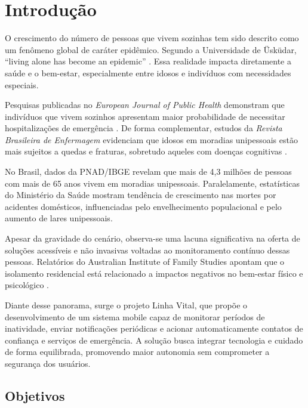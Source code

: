 \chapter{Introdução}

O crescimento do número de pessoas que vivem sozinhas tem sido descrito como um fenômeno global de caráter epidêmico. Segundo a Universidade de Üsküdar, ``living alone has become an epidemic'' \cite{erdogan2024}. Essa realidade impacta diretamente a saúde e o bem-estar, especialmente entre idosos e indivíduos com necessidades especiais.

Pesquisas publicadas no \textit{European Journal of Public Health} demonstram que indivíduos que vivem sozinhos apresentam maior probabilidade de necessitar hospitalizações de emergência \cite{kandler2017}. De forma complementar, estudos da \textit{Revista Brasileira de Enfermagem} evidenciam que idosos em moradias unipessoais estão mais sujeitos a quedas e fraturas, sobretudo aqueles com doenças cognitivas \cite{perseguino2017}.

No Brasil, dados da PNAD/IBGE revelam que mais de 4,3 milhões de pessoas com mais de 65 anos vivem em moradias unipessoais. Paralelamente, estatísticas do Ministério da Saúde mostram tendência de crescimento nas mortes por acidentes domésticos, influenciadas pelo envelhecimento populacional e pelo aumento de lares unipessoais.

Apesar da gravidade do cenário, observa-se uma lacuna significativa na oferta de soluções acessíveis e não invasivas voltadas ao monitoramento contínuo dessas pessoas. Relatórios do Australian Institute of Family Studies apontam que o isolamento residencial está relacionado a impactos negativos no bem-estar físico e psicológico \cite{aifs2014}.

Diante desse panorama, surge o projeto Linha Vital, que propõe o desenvolvimento de um sistema mobile capaz de monitorar períodos de inatividade, enviar notificações periódicas e acionar automaticamente contatos de confiança e serviços de emergência. A solução busca integrar tecnologia e cuidado de forma equilibrada, promovendo maior autonomia sem comprometer a segurança dos usuários.

\section{Objetivos}

